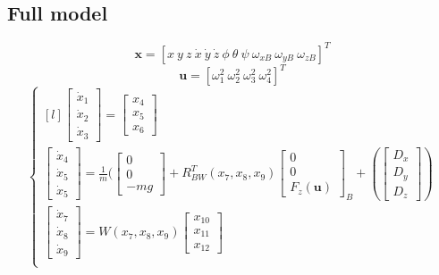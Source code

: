 \documentclass[a4paper, 12pt]{report}
\begin{document}
\subsection{Full model}
 \[\boldsymbol{x} =  [x \ y \ z \ \dot x \ \dot y \ \dot z \ \phi \ \theta \ \psi \ \omega_{xB} \ \omega_{yB} \ \omega_{zB}]^T \]
 \[ \boldsymbol{u} = [\omega^2_1 \  \omega^2_2 \  \omega^2_3 \  \omega^2_4]^T \]
\[\left\{ \begin{matrix}[l]
\begin{bmatrix} \dot x_{1}\\\dot x_{2} \\ \dot x_{3} \end{bmatrix} = \begin{bmatrix}  x_{4}\\ x_{5} \\ x_{6} \end{bmatrix}\\
\begin{bmatrix} \dot x_{4}\\\dot x_{5} \\ \dot x_{5} \end{bmatrix} = \frac{1}{m}(\begin{bmatrix}  0\\ 0\\ -mg \end{bmatrix} + R_{BW}^T(x_7, x_8, x_9) \begin{bmatrix}  0\\ 0\\ F_{z}(\boldsymbol{u}) \end{bmatrix}_B + (\begin{bmatrix}  D_x\\ D_y\\ D_z \end{bmatrix})\\
\begin{bmatrix} \dot x_{7}\\\dot x_{8} \\ \dot x_{9} \end{bmatrix} = W(x_7, x_8, x_9)\begin{bmatrix}  x_{10}\\ x_{11} \\ x_{12} \end{bmatrix} \\

\end{matrix}\]
\end{document}
